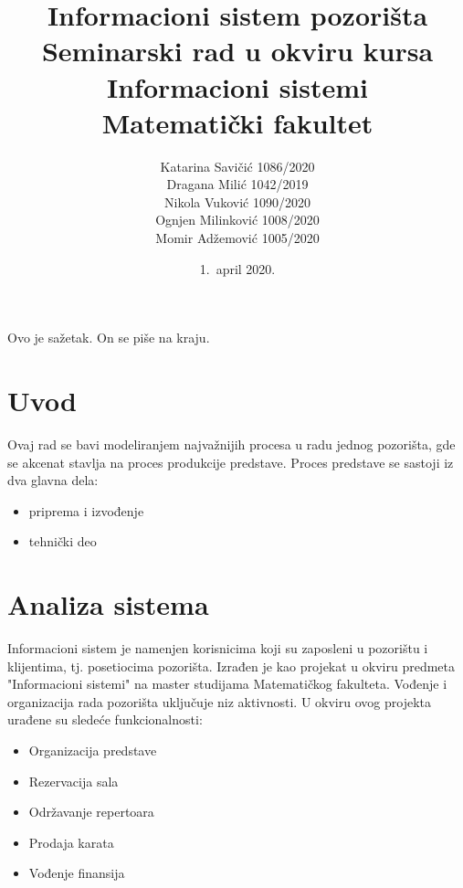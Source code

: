 \documentclass[a4paper]{article}
\begin{document}
\title{Informacioni sistem pozorišta\\ \small{Seminarski rad u okviru kursa\\Informacioni sistemi\\ Matematički fakultet}}

\author{
Katarina Savičić 1086/2020\\
Dragana Milić 1042/2019\\
Nikola Vuković 1090/2020\\
Ognjen Milinković 1008/2020\\
Momir Adžemović 1005/2020
}

\date{1.~april 2020.}

\maketitle

\abstract

Ovo je sažetak. On se piše na kraju.

\newpage

\tableofcontents

\newpage

\section{Uvod}
Ovaj rad se bavi modeliranjem najvažnijih procesa u radu jednog pozorišta, gde se akcenat
stavlja na proces produkcije predstave. Proces predstave se sastoji iz dva glavna 
dela\cite{hamilton_theatre_producing_the_drama}:
\begin{itemize}
  \item priprema i izvođenje
  \item tehnički deo
\end{itemize}

\section{Analiza sistema}
Informacioni sistem je namenjen korisnicima koji su zaposleni u pozorištu i klijentima, tj. posetiocima 
pozorišta. Izrađen je kao projekat u okviru predmeta "Informacioni sistemi" na master studijama Matematičkog fakulteta. 
Vođenje i organizacija rada pozorišta uključuje niz aktivnosti. U okviru ovog projekta urađene su 
sledeće funkcionalnosti:

  \begin{itemize}
    \item Organizacija predstave
    \item Rezervacija sala
    \item Održavanje repertoara
    \item Prodaja karata
    \item Vođenje finansija
  \end{itemize}
  
\end{document}
